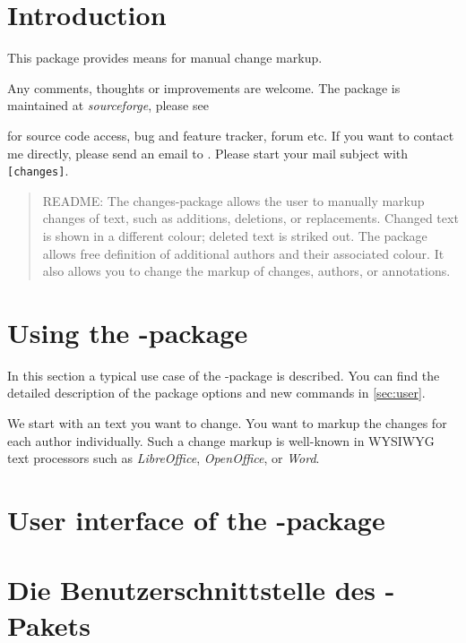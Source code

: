 \section{Introduction}

This package provides means for manual change markup.

Any comments, thoughts or improvements are welcome.
The package is maintained at \emph{sourceforge}, please see



for source code access, bug and feature tracker, forum etc.
If you want to contact me directly, please send an email to .
Please start your mail subject with \texttt{[changes]}.

\begin{quote}
	\small\textsc{README:}
	The changes-package allows the user to manually markup changes of text, such as additions, deletions, or replacements.
	Changed text is shown in a different colour; deleted text is striked out.
	The package allows free definition of additional authors and their associated colour.
	It also allows you to change the markup of changes, authors, or annotations.
\end{quote}


\section{Using the -package}
\label{sec:usage}

In this section a typical use case of the -package is described.
You can find the detailed description of the package options and new commands in \autoref{sec:user}.

We start with an text you want to change.
You want to markup the changes for each author individually.
Such a change markup is well-known in WYSIWYG text processors such as \emph{LibreOffice}, \emph{OpenOffice}, or \emph{Word}.







\ifENGLISH
\section{User interface of the -package}
\fi
\ifGERMAN
	\section{Die Benutzerschnittstelle des -Pakets}
\fi
\label{sec:user}

